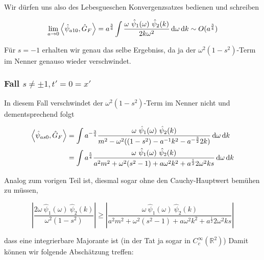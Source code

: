 
Wir dürfen uns also des Lebesgueschen Konvergenzsatzes bedienen und schreiben

\begin{equation}
    \lim_{a \rightarrow 0} \left< \hat\psi_{a10}, \hat G_F \right> =
    a^{\frac{3}{4}} \int \frac{
    \omega ~\hat \psi_1(\omega) ~\hat \psi_2(k)
    }
    {
    2k \omega^2
    }
    \mathop{}\!\mathrm{d} \omega \mathop{}\!\mathrm{d} k
    \sim O(a^{\frac{3}{4}})
    \label{eq:gf_s=1_tx=0}
\end{equation}

Für $s = -1$ erhalten wir genau das selbe Ergebniss, da ja der $\omega^2 (1-s^2)$-Term
im Nenner genauso wieder verschwindet.

\subsubsection*{Fall $s \neq \pm 1, t' = 0 = x'$}
In diesem Fall verschwindet der $\omega^2 (1-s^2)$-Term im Nenner nicht und
dementsprechend folgt

\begin{align*}
    \left< \hat\psi_{as0}, \hat G_F \right>
    &=
    \int a^{-\frac{3}{4}} \frac{
        \omega ~\hat \psi_1(\omega) ~\hat \psi_2(k)
    }
    {
        m^2-\omega^2 ((1-s^2) - a^{-1}k^2 - a^{-\frac{3}{2}}2 k )
    }
    \mathop{}\!\mathrm{d} \omega \mathop{}\!\mathrm{d} k \\
    &=
    \int a^{\frac{5}{4}} \frac{
        \omega ~\hat \psi_1(\omega) ~\hat \psi_2(k)
    }
    {
        a^2 m^2+\omega^2 (s^2-1) + a \omega^2 k^2 + a^{\frac{1}{2}}2 \omega^2 k s
    }
    \mathop{}\!\mathrm{d} \omega \mathop{}\!\mathrm{d} k
    \label{eq:gf_s=-1_tx=0}
\end{align*}

Analog zum vorigen Teil ist, diesmal sogar ohne den Cauchy-Hauptwert bemühen zu
müssen,


\begin{equation*}
    \left|
        \frac{2 \omega ~\hat \psi_1(\omega) ~\hat \psi_2(k)}{\omega^2 (1-s^2)}
    \right|
    \geq
    \left|
        \frac{
        \omega ~\hat \psi_1(\omega) ~\hat \psi_2(k)
    }
    {
        a^2 m^2+\omega^2 (s^2-1) + a \omega^2 k^2 + a^{\frac{1}{2}}2 \omega^2 k s
    }
    \right|
\end{equation*}

dass eine integrierbare Majorante ist (in der Tat ja sogar in $C_c^\infty (\mathbb{R}^2)$)
Damit können wir folgende Abschätzung treffen:

